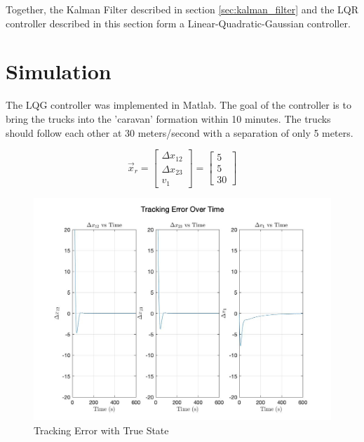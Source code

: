 \documentclass[12pt,onecolumn,reqno]{amsart}
\begin{document}
Together, the Kalman Filter described in section \ref{sec:kalman_filter} and the
LQR controller described in this section form a Linear-Quadratic-Gaussian
controller.


\section{Simulation}
The LQG controller was implemented in Matlab. The goal of the controller is to
bring the trucks into the 'caravan' formation within 10 minutes. The trucks
should follow each other at 30 meters/second with a separation of only 5 meters.

\begin{equation*}
  \vec{x}_{r} = 
  \begin{bmatrix}
    \Delta x_{12} \\ 
    \Delta x_{23} \\ 
    v_{1}
  \end{bmatrix} 
  =
  \begin{bmatrix}
    5 \\
    5 \\
    30
  \end{bmatrix} 
\end{equation*}

\begin{figure}[H]
	\includegraphics[width=\linewidth]{tracking_error_over_time_with_truth.jpg}
	\caption{Tracking Error with True State}
	\label{fig:Tracking Error with True State}
\end{figure}
\end{document}
